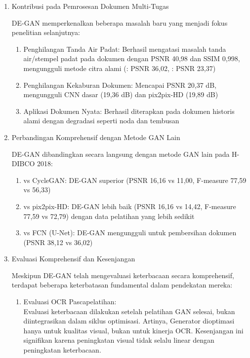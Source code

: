 \begin{enumerate}[leftmargin=*, labelindent=0pt, itemsep=1ex, topsep=0pt]

\item Kontribusi pada Pemrosesan Dokumen Multi-Tugas

DE-GAN memperkenalkan beberapa masalah baru yang menjadi fokus penelitian selanjutnya:

\begin{enumerate}[leftmargin=1.5em, labelsep=0.5em, itemindent=0pt, label=\alph*., topsep=0pt, parsep=0pt, itemsep=0pt]
      \item Penghilangan Tanda Air Padat: Berhasil mengatasi masalah tanda air/stempel padat pada dokumen dengan PSNR 40,98 dan SSIM 0,998, mengungguli metode citra alami (\parencite{dekel2024}: PSNR 36,02, \parencite{wu2023}: PSNR 23,37)
      \item Penghilangan Kekaburan Dokumen: Mencapai PSNR 20,37 dB, mengungguli CNN dasar (19,36 dB) dan pix2pix-HD (19,89 dB)
      \item Aplikasi Dokumen Nyata: Berhasil diterapkan pada dokumen historis alami dengan degradasi seperti noda dan tembusan
\end{enumerate}

\item Perbandingan Komprehensif dengan Metode GAN Lain

DE-GAN dibandingkan secara langsung dengan metode GAN lain pada H-DIBCO 2018:

\begin{enumerate}[leftmargin=1.5em, labelsep=0.5em, itemindent=0pt, label=\alph*., topsep=0pt, parsep=0pt, itemsep=0pt]
      \item vs CycleGAN: DE-GAN superior (PSNR 16,16 vs 11,00, F-measure 77,59 vs 56,33)
      \item vs pix2pix-HD: DE-GAN lebih baik (PSNR 16,16 vs 14,42, F-measure 77,59 vs 72,79) dengan data pelatihan yang lebih sedikit
      \item vs FCN (U-Net): DE-GAN mengungguli untuk pembersihan dokumen (PSNR 38,12 vs 36,02)
\end{enumerate}

\item Evaluasi Komprehensif dan Kesenjangan

Meskipun DE-GAN telah mengevaluasi keterbacaan secara komprehensif, terdapat beberapa keterbatasan fundamental dalam pendekatan mereka:

\begin{enumerate}[leftmargin=1.5em, labelsep=0.5em, itemindent=0pt, label=\alph*., topsep=0pt, parsep=0pt, itemsep=0pt]
      \item Evaluasi OCR Pascapelatihan: \mbox{}\\[0.1em]
            Evaluasi keterbacaan dilakukan setelah pelatihan GAN selesai, bukan diintegrasikan dalam siklus optimisasi. Artinya, Generator dioptimasi hanya untuk kualitas visual, bukan untuk kinerja OCR. Kesenjangan ini signifikan karena peningkatan visual tidak selalu linear dengan peningkatan keterbacaan.


\end{enumerate}
\end{enumerate}
